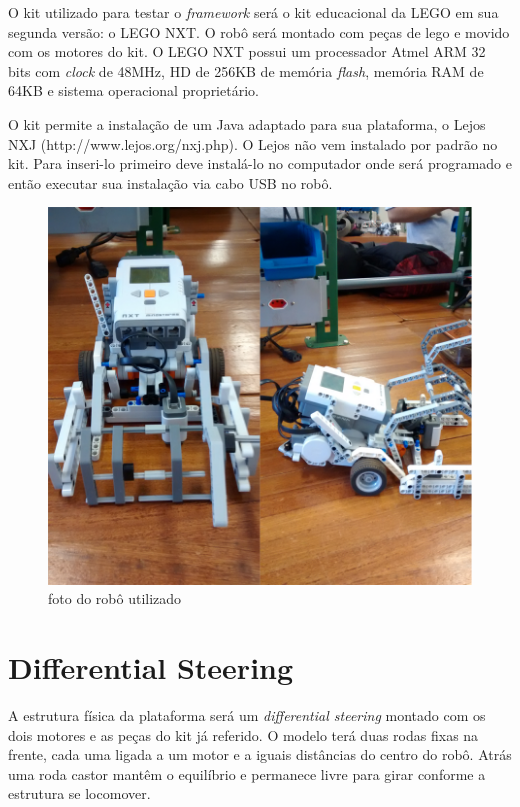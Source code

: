 O kit utilizado para testar o \textit{framework} será o kit educacional da LEGO em sua segunda versão: o LEGO NXT. O robô será montado com peças de lego e movido com os motores do kit. O LEGO NXT possui um processador Atmel ARM 32 bits com \textit{clock} de 48MHz, HD de 256KB de memória \textit{flash}, memória RAM de 64KB e sistema operacional proprietário.

O kit permite a instalação de um Java adaptado para sua plataforma, o Lejos NXJ (http://www.lejos.org/nxj.php). O Lejos não vem instalado por padrão no kit. Para inseri-lo primeiro deve instalá-lo no computador onde será programado e então executar sua instalação via cabo USB no robô.

\begin{figure}[h]
	\centering
	\label{fig16}
		\includegraphics[keepaspectratio=true,scale=0.4]{figuras/5nxtBrick.png}
	\caption{foto do robô utilizado}
\end{figure}

\section{Differential Steering}

A estrutura física da plataforma será um \textit{differential steering} montado com os dois motores e as peças do kit já referido. O modelo terá duas rodas fixas na frente, cada uma ligada a um motor e a iguais distâncias do centro do robô. Atrás uma roda castor mantêm o equilíbrio e permanece livre para girar conforme a estrutura se locomover.

